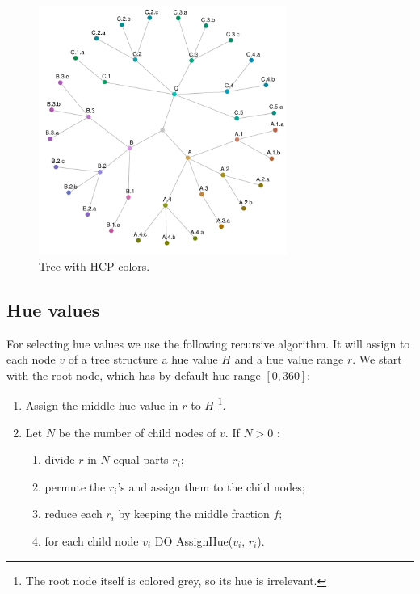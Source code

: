 \documentclass[journal]{vgtc}                %
\begin{document}
\begin{figure}[htb]

  \centering
  \includegraphics[width=3.2in]{HCPgraph.pdf}
  \caption{Tree with HCP colors.}\label{fig:graph}

\end{figure}

\subsection{Hue values}

For selecting hue values we use the following recursive algorithm. It will assign to each node $v$ of a tree structure a hue value $H$ and a hue value range $r$.
We start with the root node, which has by default hue range $[0, 360]$:

\begin{enumerate} \itemsep1pt \parskip0pt 
\item Assign the middle hue value in $r$ to $H$ \footnote{The root node itself is colored grey, so its hue is irrelevant.}.
\item Let $N$ be the number of child nodes of $v$. If $N>0$ :
\begin{enumerate}[i] \itemsep1pt \parskip0pt 
\item divide $r$ in $N$ equal parts $r_i$;
\item permute the $r_i$'s and assign them to the child nodes;
\item reduce each $r_i$ by keeping the middle fraction $f$;
\item for each child node $v_i$ DO AssignHue($v_i$, $r_i$).
\end{enumerate}
\end{enumerate}
\end{document}
